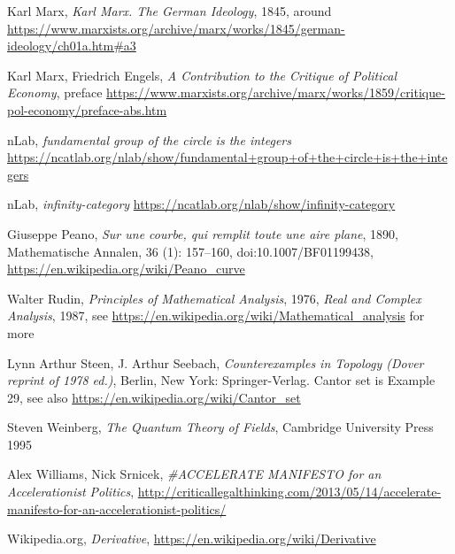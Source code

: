 \documentclass{article}
\begin{document}
\begin{thebibliography}{99}
 Karl Marx, \textit{Karl Marx. The German Ideology}, 1845, around \url{https://www.marxists.org/archive/marx/works/1845/german-ideology/ch01a.htm#a3}

 Karl Marx, Friedrich Engels, \textit{A Contribution to the Critique of Political Economy}, preface \url{https://www.marxists.org/archive/marx/works/1859/critique-pol-economy/preface-abs.htm}

 nLab, \textit{fundamental group of the circle is the integers} \url{https://ncatlab.org/nlab/show/fundamental+group+of+the+circle+is+the+integers}

 nLab, \textit{infinity-category} \url{https://ncatlab.org/nlab/show/infinity-category}

 Giuseppe Peano, \textit{Sur une courbe, qui remplit toute une aire plane}, 1890, Mathematische Annalen, 36 (1): 157–160, doi:10.1007/BF01199438, \url{https://en.wikipedia.org/wiki/Peano_curve}

 Walter Rudin, \textit{Principles of Mathematical Analysis}, 1976, \textit{Real and Complex Analysis}, 1987, see \url{https://en.wikipedia.org/wiki/Mathematical_analysis} for more

 Lynn Arthur Steen, J. Arthur Seebach, \textit{Counterexamples in Topology (Dover reprint of 1978 ed.)}, Berlin, New York: Springer-Verlag. Cantor set is Example 29, see also \url{https://en.wikipedia.org/wiki/Cantor_set}

 Steven Weinberg, \textit{The Quantum Theory of Fields}, Cambridge University Press 1995

 Alex Williams, Nick Srnicek, \textit{\#ACCELERATE MANIFESTO for an Accelerationist Politics}, \url{http://criticallegalthinking.com/2013/05/14/accelerate-manifesto-for-an-accelerationist-politics/}



 Wikipedia.org, \textit{Derivative}, \url{https://en.wikipedia.org/wiki/Derivative}

\end{thebibliography}
\end{document}

